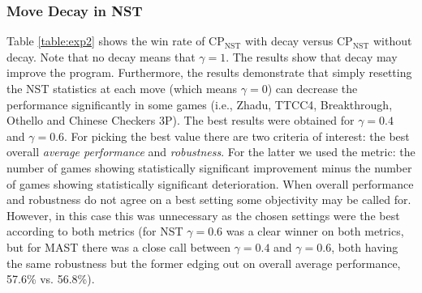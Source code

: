 \documentclass[journal]{IEEEtran}
\begin{document}
\subsubsection{Move Decay in NST}
Table \ref{table:exp2} shows the win rate of CP$_{\textrm{NST}}$ with decay versus CP$_{\textrm{NST}}$ without decay. Note that no decay means that $\gamma = 1$. The results show that decay may improve the program. Furthermore, the results demonstrate that simply resetting the NST statistics at each move (which means $\gamma = 0$) can decrease the performance significantly in some games (i.e., Zhadu, TTCC4, Breakthrough, Othello and Chinese Checkers 3P). The best results were obtained for $\gamma = 0.4$ and $\gamma = 0.6$.  For picking the best value there are two criteria of interest: the best overall {\em average performance} and {\em robustness}. For the latter we used the metric: the number of games showing statistically significant improvement minus the number of games showing statistically significant deterioration.  When overall performance and robustness do not agree on a best setting some objectivity may be called for.  However, in this case this was unnecessary as the chosen settings were the best according to both metrics (for NST $\gamma=0.6$ was a clear winner on both metrics, but for MAST there was a close call between $\gamma=0.4$ and $\gamma=0.6$, both having the same robustness but the former edging out on overall average performance, 57.6\% vs. 56.8\%).
\end{document}
